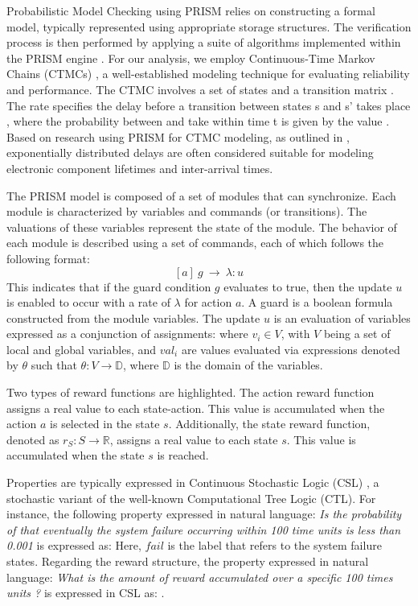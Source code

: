 Probabilistic Model Checking using PRISM \cite{Kwiatkowskaprism2011} relies on constructing a formal model, typically represented using appropriate storage structures. The verification process is then performed by applying a suite of algorithms implemented within the PRISM engine \cite{engines}. For our analysis, we employ Continuous-Time Markov Chains (CTMCs) \cite{Kwiatkowska2007}, a well-established modeling technique for evaluating reliability and performance. The CTMC involves a set of states and a transition matrix .  The rate specifies the delay before a transition between states s and s' takes place , where the probability between  and  take within time t is given by the value . Based on research using PRISM for CTMC modeling, as outlined in \cite{prismctmc}, exponentially distributed delays are often considered suitable for modeling electronic component lifetimes and inter-arrival times. 

The PRISM model is composed of a set of modules that can synchronize. Each module is characterized by variables and commands (or transitions). The valuations of these variables represent the state of the module. The behavior of each module is described using a set of commands, each of which follows the following format:
\[
[a] \ g \ \rightarrow \ \lambda: u
\]
This indicates that if the guard condition \( g \) evaluates to true, then the update \( u \) is enabled to occur with a rate of \( \lambda \) for action \( a \). A guard is a boolean formula constructed from the module variables. The update \( u \) is an evaluation of variables expressed as a conjunction of assignments:  where \( v_{i} \in V \), with \( V \) being a set of local and global variables, and \( val_{i} \) are values evaluated via expressions denoted by \( \theta \) such that \( \theta: V \rightarrow \mathbb{D} \), where \( \mathbb{D} \) is the domain of the variables.

Two types of reward functions are highlighted. The action reward function assigns a real value to each state-action. This value is accumulated when the action \( a \) is selected in the state \( s \). Additionally, the state reward function, denoted as \( r_{S} : S \longrightarrow \mathbb{R} \), assigns a real value to each state \( s \). This value is accumulated when the state \( s \) is reached.

Properties are typically expressed in Continuous Stochastic Logic (CSL) \cite{kwiatkowska2002approximate}, a stochastic variant of the well-known Computational Tree Logic (CTL).  For instance, the following property expressed in natural language: \emph{Is the probability of that eventually the system failure occurring within 100 time units is less than 0.001} is expressed  as: 
Here, \(fail\) is the label that refers to the system failure states. 
Regarding the reward structure, the property expressed in natural language: \emph{What is the amount of reward accumulated over a specific 100 times units ?} is expressed in CSL as:
.

